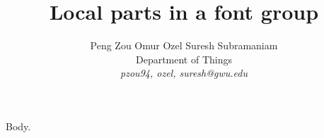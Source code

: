 \documentclass{article}
\begin{document}
\title{Local parts in a font group}
\author{Peng Zou \qquad Omur Ozel \qquad Suresh Subramaniam \\
\normalsize Department of Things \\
\normalsize {\it pzou94, ozel, suresh@gwu.edu}}
\maketitle
Body.
\end{document}

